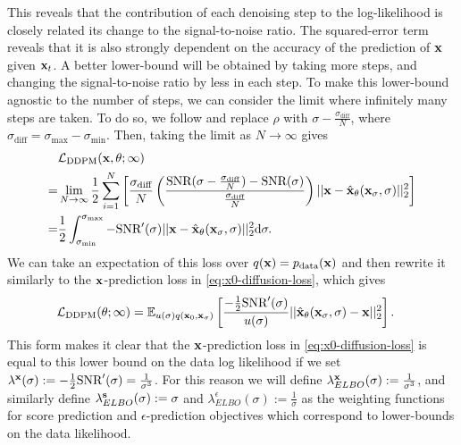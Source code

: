 This reveals that the contribution of each denoising step to the log-likelihood is closely related its change to the signal-to-noise ratio. The squared-error term reveals that it is also strongly dependent on the accuracy of the prediction of ${\mathbf{x}}$ given ${\mathbf{x}}_t$. A better lower-bound will be obtained by taking more steps, and changing the signal-to-noise ratio by less in each step. To make this lower-bound agnostic to the number of steps, we can consider the limit where infinitely many steps are taken. To do so, we  follow \citet{kingma2021variational} and replace $\rho$ with $\sigma-\frac{\sigma_\text{diff}}{N}$, where $\sigma_\text{diff} = \sigma_\text{max}-\sigma_\text{min}$. Then, taking the limit as $N \rightarrow \infty$ gives 
\begin{align}
    &\mathcal{L}_\text{DDPM}({\mathbf{x}}, \theta; \infty) \\
    = &\lim_{N\rightarrow\infty}  \frac{1}{2} \sum_{i=1}^N \left[ \frac{\sigma_\text{diff}}{N} \left( \frac{\text{SNR}(\sigma-\frac{\sigma_\text{diff}}{N}) - \text{SNR}(\sigma)}{\frac{\sigma_\text{diff}}{N}} \right) || {\mathbf{x}} - \hat{{\mathbf{x}}}_\theta({\mathbf{x}}_\sigma, \sigma) ||_2^2 \right] \\
    = &\frac{1}{2} \int_{\sigma_\text{min}}^{\sigma_\text{max}} -\text{SNR}'(\sigma) || {\mathbf{x}} - \hat{{\mathbf{x}}}_\theta({\mathbf{x}}_\sigma, \sigma) ||_2^2 \mathrm{d}\sigma \label{eq:diffusion-elbo}.
\end{align}
We can take an expectation of this loss over $q({\mathbf{x}})=p_{\rm{data}}({\mathbf{x}})$ and then rewrite it similarly to the ${\mathbf{x}}$-prediction loss in \cref{eq:x0-diffusion-loss}, which gives
\begin{align} \label{eq:diffusion-loss-likelihood}
    \mathcal{L}_\text{DDPM}(\theta; \infty) &= \mathbb{E}_{u(\sigma)q({\mathbf{x}}_0, {\mathbf{x}}_\sigma)} \left[ 
    \frac{-\frac{1}{2}\text{SNR}'(\sigma)}{u(\sigma)}
    || \hat{{\mathbf{x}}}_\theta({\mathbf{x}}_\sigma, \sigma) - {\mathbf{x}} ||_2^2 \right].
\end{align}
This form makes it clear that the ${\mathbf{x}}$-prediction loss in \cref{eq:x0-diffusion-loss} is equal to this lower bound on the data log likelihood if we set $\lambda^{\mathbf{x}}(\sigma) := - \frac{1}{2} \text{SNR}'(\sigma) = \frac{1}{\sigma^3}$. For this reason we will define $\lambda^{\mathbf{x}}_{ELBO}(\sigma) := \frac{1}{\sigma^3}$, and similarly define $\lambda^{\mathbf{s}}_{ELBO}(\sigma) := \sigma$ and $\lambda^\epsilon_{ELBO}(\sigma) := \frac{1}{\sigma}$ as the weighting functions for score prediction and $\epsilon$-prediction objectives which correspond to lower-bounds on the data likelihood.

